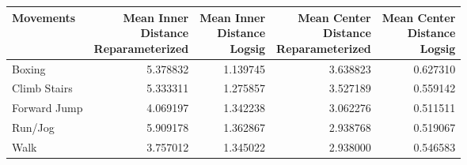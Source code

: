 \begin{tabular}{lrrrr}
\toprule
Movements & \makecell{Mean Inner \\ Distance \\ Reparameterized} & \makecell{Mean Inner \\ Distance \\ Logsig} & \makecell{Mean Center \\ Distance \\ Reparameterized} & \makecell{Mean Center \\ Distance \\ Logsig} \\
\midrule
Boxing & 5.378832 & 1.139745 & 3.638823 & 0.627310 \\
Climb Stairs & 5.333311 & 1.275857 & 3.527189 & 0.559142 \\
Forward Jump & 4.069197 & 1.342238 & 3.062276 & 0.511511 \\
Run/Jog & 5.909178 & 1.362867 & 2.938768 & 0.519067 \\
Walk & 3.757012 & 1.345022 & 2.938000 & 0.546583 \\
\bottomrule
\end{tabular}
